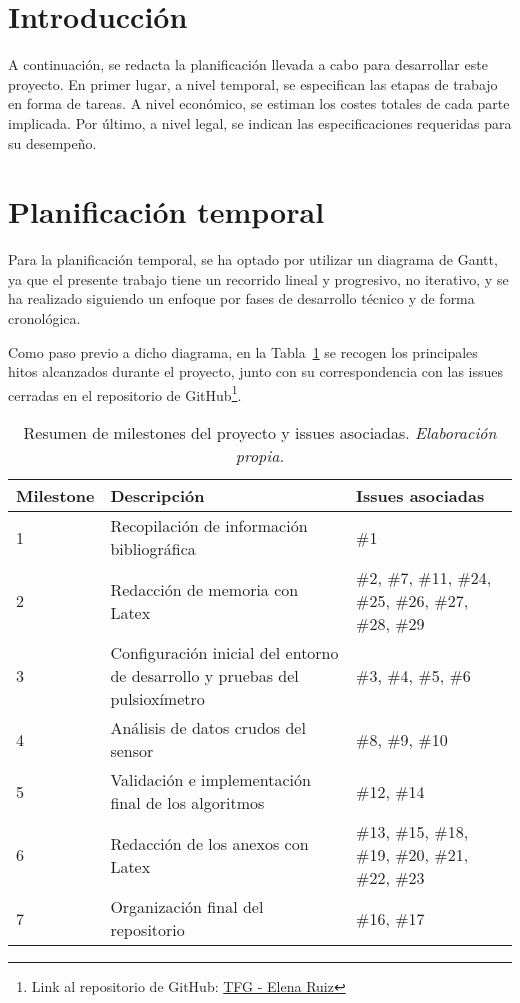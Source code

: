 
\renewcommand{\arraystretch}{1.4}
\section{Introducción}

A continuación, se redacta la planificación llevada a cabo para desarrollar este proyecto. En primer lugar, a nivel temporal, se especifican las etapas de trabajo en forma de tareas. A nivel económico, se estiman los costes totales de cada parte implicada. Por último, a nivel legal, se indican las especificaciones requeridas para su desempeño.

\section{Planificación temporal}
Para la planificación temporal, se ha optado por utilizar un diagrama de Gantt, ya que el presente trabajo tiene un recorrido lineal y progresivo, no iterativo, y se ha realizado siguiendo un enfoque por fases de desarrollo técnico y de forma cronológica. 

Como paso previo a dicho diagrama, en la Tabla~\ref{tab:milestones} se recogen los principales hitos alcanzados durante el proyecto, junto con su correspondencia con las issues cerradas en el repositorio de GitHub\footnote{Link al repositorio de GitHub: \href{https://github.com/ElenaRuizMoreno/TFG-Elena-Ruiz/}{TFG - Elena Ruiz}}.

\vspace{0.3cm}
\begin{table}[H]
\centering
\renewcommand{\arraystretch}{1.1} %
\begin{tabularx}{\textwidth}{|l|X|X|}
\hline
\textbf{Milestone} & \textbf{Descripción} & \textbf{Issues asociadas} \\
\hline
1 & Recopilación de información bibliográfica & \#1 \\
\hline
2 & Redacción de memoria con Latex & 
\#2, \#7, \#11, \#24, \#25, \#26, \#27, \#28, \#29 \\
\hline
3 & Configuración inicial del entorno de desarrollo y pruebas del pulsioxímetro & 
\#3, \#4, \#5, \#6 \\
\hline
4 & Análisis de datos crudos del sensor & 
\#8, \#9, \#10 \\
\hline
5 & Validación e implementación final de los algoritmos & \#12, \#14 \\
\hline
6 & Redacción de los anexos con Latex & 
\#13, \#15, \#18, \#19, \#20, \#21, \#22, \#23 \\
\hline
7 & Organización final del repositorio & 
\#16, \#17 \\
\hline
\end{tabularx}
\caption{Resumen de milestones del proyecto y issues asociadas. \textit{Elaboración propia.}}
\label{tab:milestones}
\end{table}



